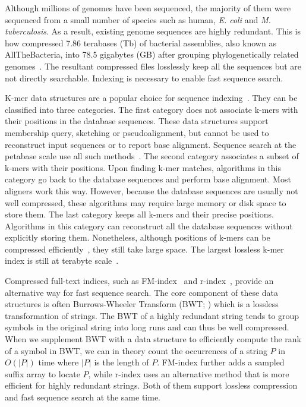 \documentclass[webpdf,contemporary,large,namedate]{oup-authoring-template}%
\begin{document}
Although millions of genomes have been sequenced,
the majority of them were sequenced from a small number of species such as human, \emph{E. coli} and \emph{M. tuberculosis}.
As a result, existing genome sequences are highly redundant.
This is how \citet{Hunt2024.03.08.584059} compressed 7.86 terabases (Tb) of bacterial assemblies, also known as AllTheBacteria, into 78.5 gigabytes (GB)
after grouping phylogenetically related genomes~\citep{Brinda:2024aa}.
The resultant compressed files losslessly keep all the sequences but are not directly searchable.
Indexing is necessary to enable fast sequence search.

K-mer data structures are a popular choice for sequence indexing~\citep{Marchet:2021aa}.
They can be classified into three categories.
The first category does not associate k-mers with their positions in the database sequences.
These data structures support membership query, sketching or pseudoalignment,
but cannot be used to reconstruct input sequences or to report base alignment.
Sequence search at the petabase scale use all such methods~\citep{Edgar:2022aa,Karasikov2020.10.01.322164,Shiryev:2024aa}.
The second category associates a subset of k-mers with their positions.
Upon finding k-mer matches, algorithms in this category go back to the database sequences and perform base alignment.
Most aligners work this way.
However, because the database sequences are usually not well compressed,
these algorithms may require large memory or disk space to store them.
The last category keeps all k-mers and their precise positions.
Algorithms in this category can reconstruct all the database sequences without explicitly storing them.
Nonetheless, although positions of k-mers can be compressed efficiently~\citep{Karasikov:2020aa},
they still take large space.
The largest lossless k-mer index is still at terabyte scale~\citep{Karasikov2020.10.01.322164}.

Compressed full-text indices, such as FM-index~\citep{DBLP:conf/focs/FerraginaM00} and r-index~\citep{DBLP:conf/soda/GagieNP18,DBLP:journals/tcs/BannaiGI20,DBLP:journals/jacm/GagieNP20},
provide an alternative way for fast sequence search.
The core component of these data structures is often Burrows-Wheeler Transform (BWT; \citealt*{Burrows:1994aa})
which is a lossless transformation of strings.
The BWT of a highly redundant string tends to group symbols in the original string into long runs
and can thus be well compressed.
When we supplement BWT with a data structure to efficiently compute the rank of a symbol in BWT,
we can in theory count the occurrences of a string $P$ in $O(|P|)$ time where $|P|$ is the length of $P$.
FM-index further adds a sampled suffix array to locate $P$,
while r-index uses an alternative method that is more efficient for highly redundant strings.
Both of them support lossless compression and fast sequence search at the same time.
\end{document}
